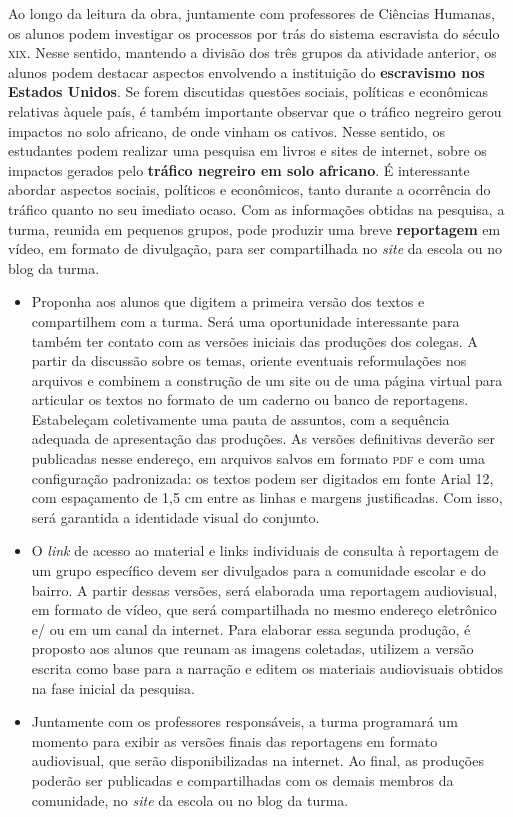 \documentclass[11pt]{extarticle}
\begin{document}
Ao longo da leitura da obra, juntamente com professores de Ciências
Humanas, os alunos podem investigar os processos por trás do sistema
escravista do século \textsc{xix}. Nesse sentido, mantendo a divisão dos três
grupos da atividade anterior, os alunos podem destacar aspectos
envolvendo a instituição do \textbf{escravismo nos Estados Unidos}. Se
forem discutidas questões sociais, políticas e econômicas relativas
àquele país, é também importante observar que o tráfico negreiro gerou
impactos no solo africano, de onde vinham os cativos. Nesse sentido, os
estudantes podem realizar uma pesquisa em livros e sites de internet,
sobre os impactos gerados pelo \textbf{tráfico negreiro em solo
africano}. É interessante abordar aspectos sociais, políticos e
econômicos, tanto durante a ocorrência do tráfico quanto no seu imediato
ocaso. Com as informações obtidas na pesquisa, a turma, reunida em
pequenos grupos, pode produzir uma breve \textbf{reportagem} em vídeo,
em formato de divulgação, para ser compartilhada no \emph{site} da
escola ou no blog da turma.


\begin{itemize}
\item
  Proponha aos alunos que digitem a primeira versão dos textos e
  compartilhem com a turma. Será uma oportunidade interessante para
  também ter contato com as versões iniciais das produções dos colegas.
  A partir da discussão sobre os temas, oriente eventuais reformulações
  nos arquivos e combinem a construção de um site ou de uma página
  virtual para articular os textos no formato de um caderno ou banco de
  reportagens. Estabeleçam coletivamente uma pauta de assuntos, com a sequência
  adequada de apresentação das produções. As versões definitivas deverão
  ser publicadas nesse endereço, em arquivos salvos em formato \textsc{pdf} e com
  uma configuração padronizada: os textos podem ser digitados em fonte
  Arial 12, com espaçamento de 1,5 cm entre as linhas e margens
  justificadas. Com isso, será garantida a identidade visual do
  conjunto.
\item
  O \emph{link} de acesso ao material e links individuais de consulta à
  reportagem de um grupo específico devem ser divulgados para a
  comunidade escolar e do bairro. A partir dessas versões, será
  elaborada uma reportagem audiovisual, em formato de vídeo, que será
  compartilhada no mesmo endereço eletrônico e/ ou em um canal da
  internet. Para elaborar essa segunda produção, é proposto aos alunos que 
  reunam as imagens coletadas, utilizem a versão escrita como base para a 
  narração e editem os materiais audiovisuais obtidos na fase inicial da pesquisa.
\item
  Juntamente com os professores responsáveis, a turma programará um
  momento para exibir as versões finais das reportagens em formato
  audiovisual, que serão disponibilizadas na internet. Ao final, as
  produções poderão ser publicadas e compartilhadas com os demais
  membros da comunidade, no \emph{site} da escola ou no blog da turma.
\end{itemize}
\end{document}
